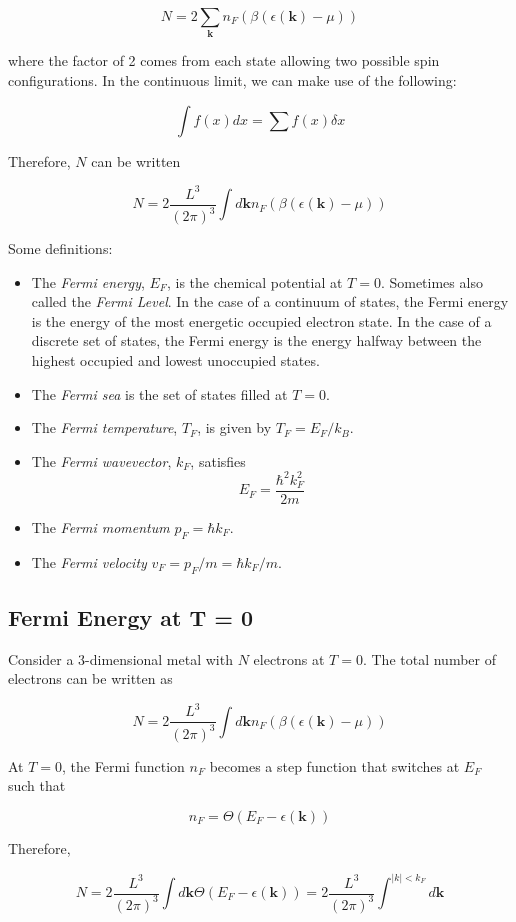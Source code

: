 \documentclass[10pt]{article}
\begin{document}
$$N = 2 \sum_{\textbf{k}}n_{F}(\beta(\epsilon(\textbf{k}) - \mu))$$

where the factor of 2 comes from each state allowing two possible spin configurations. In the continuous limit, we can make
use of the following:

$$\int f(x)dx = \sum f(x)\delta x$$

Therefore, $N$ can be written

$$
N = 2 \frac{L^{3}}{(2\pi)^{3}}\int d\textbf{k} n_{F}(\beta(\epsilon(\textbf{k}) - \mu))
$$

Some definitions:
\begin{itemize}
  \item The \emph{Fermi energy}, $E_{F}$, is the chemical potential at $T = 0$. Sometimes also called the \emph{Fermi Level}.
  In the case of a continuum of states, the Fermi energy is the energy of the most energetic occupied electron state. In the case of a discrete
  set of states, the Fermi energy is the energy halfway between the highest occupied and lowest unoccupied states.
  \item The \emph{Fermi sea} is the set of states filled at $T = 0$.
  \item The \emph{Fermi temperature}, $T_{F}$, is given by $T_{F} = E_{F}/k_{B}$.
  \item The \emph{Fermi wavevector}, $k_{F}$, satisfies
  $$E_{F} = \frac{\hbar^{2}k_{F}^{2}}{2m}$$
  \item The \emph{Fermi momentum} $p_{F} = \hbar k_{F}$.
  \item The \emph{Fermi velocity} $v_{F} = p_{F}/m = \hbar k_{F}/m$.
\end{itemize}

\subsection{Fermi Energy at T = 0}
Consider a 3-dimensional metal with $N$ electrons at $T = 0$. The total number of electrons can be written as

$$
N = 2 \frac{L^{3}}{(2\pi)^{3}}\int d\textbf{k} n_{F}(\beta(\epsilon(\textbf{k}) - \mu))
$$

At $T = 0$, the Fermi function $n_{F}$ becomes a step function that switches at $E_{F}$ such that

$$n_{F} = \Theta(E_{F} - \epsilon(\textbf{k}))$$

Therefore,

$$
N = 2 \frac{L^{3}}{(2\pi)^{3}}\int d\textbf{k} \Theta(E_{F} - \epsilon(\textbf{k})) = 2 \frac{L^{3}}{(2\pi)^{3}} \int^{|k|<k_{F}}d\textbf{k}
$$
\end{document}
